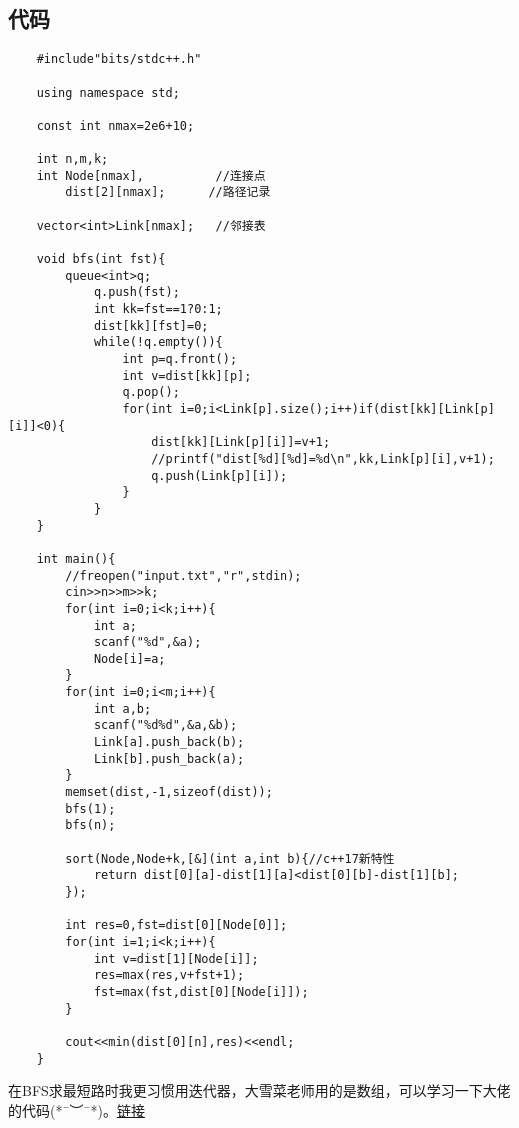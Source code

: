 \documentclass[cyan,pad,cn]{elegantnote}
\begin{document}
\subsection{代码}
\begin{lstlisting}
    #include"bits/stdc++.h"

    using namespace std;
    
    const int nmax=2e6+10;
    
    int n,m,k;
    int Node[nmax],          //连接点
        dist[2][nmax];      //路径记录
    
    vector<int>Link[nmax];   //邻接表
    
    void bfs(int fst){
        queue<int>q;
            q.push(fst);
            int kk=fst==1?0:1;
            dist[kk][fst]=0;
            while(!q.empty()){
                int p=q.front();
                int v=dist[kk][p];
                q.pop();
                for(int i=0;i<Link[p].size();i++)if(dist[kk][Link[p][i]]<0){
                    dist[kk][Link[p][i]]=v+1;
                    //printf("dist[%d][%d]=%d\n",kk,Link[p][i],v+1);
                    q.push(Link[p][i]);
                }
            }
    }
    
    int main(){
        //freopen("input.txt","r",stdin);
        cin>>n>>m>>k;
        for(int i=0;i<k;i++){
            int a;
            scanf("%d",&a);
            Node[i]=a;
        }
        for(int i=0;i<m;i++){
            int a,b;
            scanf("%d%d",&a,&b);
            Link[a].push_back(b);
            Link[b].push_back(a);
        }
        memset(dist,-1,sizeof(dist));
        bfs(1);
        bfs(n);
    
        sort(Node,Node+k,[&](int a,int b){//c++17新特性
            return dist[0][a]-dist[1][a]<dist[0][b]-dist[1][b];
        });
    
        int res=0,fst=dist[0][Node[0]];
        for(int i=1;i<k;i++){
            int v=dist[1][Node[i]];
            res=max(res,v+fst+1);
            fst=max(fst,dist[0][Node[i]]);
        }
    
        cout<<min(dist[0][n],res)<<endl;
    }
\end{lstlisting}

{在BFS求最短路时我更习惯用迭代器，大雪菜老师用的是数组，可以学习一下大佬的代码(*¯︶¯*)。\href{https://www.acwing.com/activity/content/code/content/1592514/}{链接}}
\end{document}
